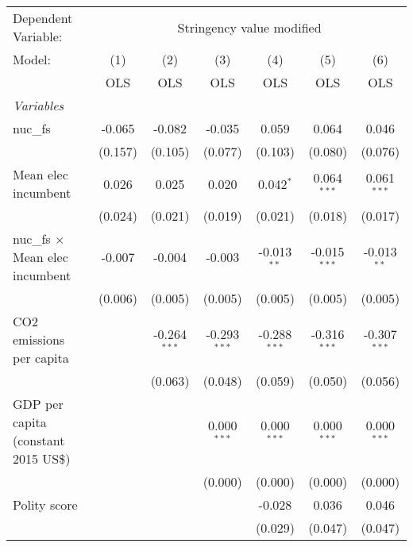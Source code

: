 
\begingroup
\centering
\begin{tabular}{lcccccc}
   \toprule
   Dependent Variable: & \multicolumn{6}{c}{Stringency value modified}\\
   Model:                                 & (1)     & (2)            & (3)            & (4)            & (5)            & (6)\\  
                                          &  OLS    & OLS            & OLS            & OLS            & OLS            & OLS\\  
   \midrule
   \emph{Variables}\\
   nuc\_fs                                & -0.065  & -0.082         & -0.035         & 0.059          & 0.064          & 0.046\\   
                                          & (0.157) & (0.105)        & (0.077)        & (0.103)        & (0.080)        & (0.076)\\   
   Mean elec incumbent                    & 0.026   & 0.025          & 0.020          & 0.042$^{*}$    & 0.064$^{***}$  & 0.061$^{***}$\\   
                                          & (0.024) & (0.021)        & (0.019)        & (0.021)        & (0.018)        & (0.017)\\   
   nuc\_fs $\times$ Mean elec incumbent   & -0.007  & -0.004         & -0.003         & -0.013$^{**}$  & -0.015$^{***}$ & -0.013$^{**}$\\   
                                          & (0.006) & (0.005)        & (0.005)        & (0.005)        & (0.005)        & (0.005)\\   
   CO2 emissions per capita               &         & -0.264$^{***}$ & -0.293$^{***}$ & -0.288$^{***}$ & -0.316$^{***}$ & -0.307$^{***}$\\   
                                          &         & (0.063)        & (0.048)        & (0.059)        & (0.050)        & (0.056)\\   
   GDP per capita (constant 2015 US\$)    &         &                & 0.000$^{***}$  & 0.000$^{***}$  & 0.000$^{***}$  & 0.000$^{***}$\\   
                                          &         &                & (0.000)        & (0.000)        & (0.000)        & (0.000)\\   
   Polity score                           &         &                &                & -0.028         & 0.036          & 0.046\\   
                                          &         &                &                & (0.029)        & (0.047)        & (0.047)\\   

\end{tabular}
